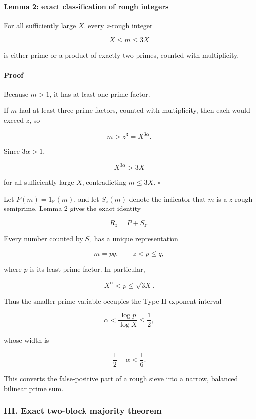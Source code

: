 \paragraph{Lemma 2: exact classification of rough integers}

For all sufficiently large \(X\), every \(z\)-rough integer

\[
X\le m\le3X
\]

is either prime or a product of exactly two primes, counted with multiplicity.

\paragraph{Proof}

Because \(m>1\), it has at least one prime factor.

If \(m\) had at least three prime factors, counted with multiplicity, then each would exceed \(z\), so

\[
m>z^3=X^{3\alpha}.
\]

Since \(3\alpha>1\),

\[
X^{3\alpha}>3X
\]

for all sufficiently large \(X\), contradicting \(m\le3X\). \(\square\)

Let \(P(m)=1_{\mathbb P}(m)\), and let \(S_z(m)\) denote the indicator that \(m\) is a \(z\)-rough semiprime. Lemma 2 gives the exact identity

\[
\boxed{R_z=P+S_z.}
\tag{8}
\]

Every number counted by \(S_z\) has a unique representation

\[
m=pq,\qquad z<p\le q,
\tag{9}
\]

where \(p\) is its least prime factor. In particular,

\[
X^\alpha<p\le\sqrt{3X}.
\tag{10}
\]

Thus the smaller prime variable occupies the Type-II exponent interval

\[
\boxed{
\alpha<
\frac{\log p}{\log X}
\le\frac12,
}
\tag{11}
\]

whose width is

\[
\boxed{\frac12-\alpha<\frac16.}
\tag{12}
\]

This converts the false-positive part of a rough sieve into a narrow, balanced bilinear prime sum.

\subsubsection*{III. Exact two-block majority theorem}


